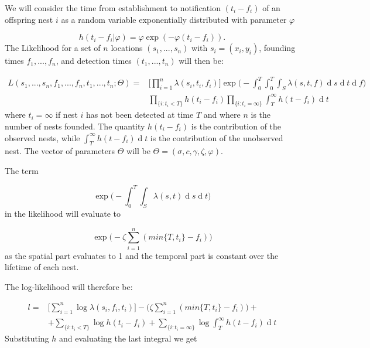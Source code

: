 \documentclass[11pt,a4paper]{article}
\renewcommand{\d}[1]{\ensuremath{\operatorname{d}\!{#1}}}
\begin{document}
We will consider the time from establishment to notification $(t_i - f_i)$ of an offspring nest $i$ as a random variable exponentially distributed with parameter $\varphi$

\begin{equation*}
    h(t_{i} - f_{i} | \varphi) = \varphi \exp (- \varphi(t_{i} - f_{i})).
\end{equation*}
The Likelihood for a set of $n$ locations $(s_{1}, ... , s_{n})$ with $s_i = (x_i, y_i)$, founding times $f_{1}, ... , f_{n}$, and detection times $(t_{1},  ... , t_{n})$ will then be:

\begin{equation*}
    \begin{aligned}
        L(s_{1}, ..., s_{n}, f_{1}, ..., f_{n}, t_{1}, ..., t_{n} ; \Theta) = & \Bigg[ \prod_{i = 1}^{n} \lambda(s_{i}, t_{i}, f_{i}) \Bigg] \exp \Bigg(- \int_{0}^{T} \int_{0}^{T} \int_{S} \lambda(s, t, f) \d s \d t \d f \Bigg) \\ 
        & \prod_{\{ i : t_{i} < T \} } h(t_{i} - f_{i}) \prod_{ \{ i : t_{i} = \infty \} } \int_{T}^{\infty} h(t - f_{i}) \d t
    \end{aligned}
\end{equation*}
where $t_{i} = \infty$ if nest $i$ has not been detected at time $T$ and where $n$ is the number of nests founded. The quantity $h(t_{i} - f_{i})$ is the contribution of the observed nests, while $\int_{T}^{\infty} h(t - f_{i}) \d t$ is the contribution of the unobserved nest. The vector of parameters $\Theta$ will be $\Theta = ( \sigma, c, \gamma, \zeta, \varphi)$.

The term 

\begin{equation*}
    \exp \bigg(- \int_{0}^{T} \int_{S} \lambda(s, t)\d s \d t \bigg)
\end{equation*}
in the likelihood will evaluate to 

\begin{equation*}
    \exp \bigg(- \zeta \sum_{i=1}^{n} (min\{ T, t_i \} - f_i) \bigg)
\end{equation*}
as the spatial part evaluates to 1 and the temporal part is constant over the lifetime of each nest.

The log-likelihood will therefore be:

\begin{equation*}
    \begin{aligned}
        l = & \Bigg[ \sum_{i = 1}^{n} \log \lambda(s_{i},f_{i}, t_{i}) \Bigg] - \bigg(\zeta \sum_{i=1}^{n} (min\{ T, t_i \} - f_i) \bigg)  + \\
        & + \sum_{\{ i : t_{i} < T \} }  \log h (t_{i} - f_{i}) + \sum_{ \{ i : t_{i} = \infty \} } \log \int_{T}^{\infty} h(t - f_{i}) \d t
    \end{aligned}
\end{equation*}
Substituting $h$ and evaluating the last integral we get 
\end{document}
